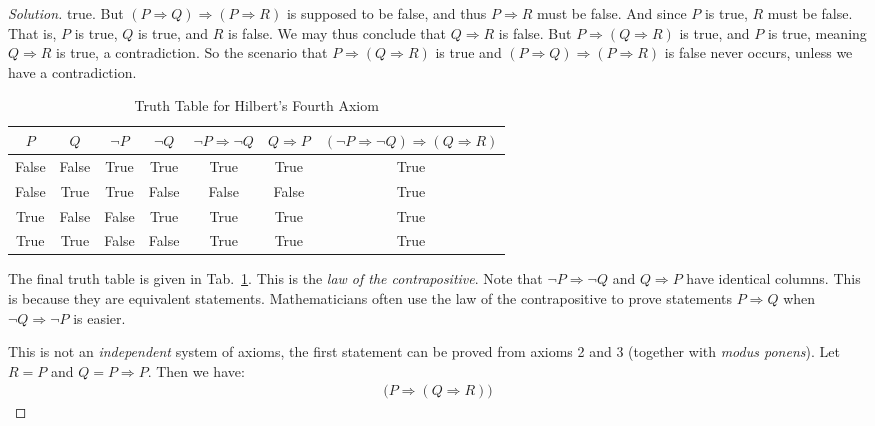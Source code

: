 \documentclass{article}
\theoremstyle{normal}
\begin{document}
\begin{proof}[Solution]
        true. But $(P\Rightarrow{Q})\Rightarrow(P\Rightarrow{R})$ is supposed
        to be false, and thus $P\Rightarrow{R}$ must be false. And since $P$ is
        true, $R$ must be false. That is, $P$ is true, $Q$ is true, and $R$ is
        false. We may thus conclude that $Q\Rightarrow{R}$ is false. But
        $P\Rightarrow(Q\Rightarrow{R})$ is true, and $P$ is true, meaning
        $Q\Rightarrow{R}$ is true, a contradiction. So the scenario that
        $P\Rightarrow(Q\Rightarrow{R})$ is true and
        $(P\Rightarrow{Q})\Rightarrow(P\Rightarrow{R})$ is false never occurs,
        unless we have a contradiction.
        \par\hfill\par
        \begin{table}
            \centering
            \begin{tabular}{c | c | c | c | c | c | c}
                $P$&$Q$&$\neg{P}$&$\neg{Q}$&
                $\neg{P}\Rightarrow\neg{Q}$&
                $Q\Rightarrow{P}$&
                $(\neg{P}\Rightarrow\neg{Q})\Rightarrow(Q\Rightarrow{R})$\\
                \hline
                False&False&True&True&True&True&True\\
                False&True&True&False&False&False&True\\
                True&False&False&True&True&True&True\\
                True&True&False&False&True&True&True
            \end{tabular}
            \caption{Truth Table for Hilbert's Fourth Axiom}
            \label{tab:hilberts_fourth}
        \end{table}
        The final truth table is given in Tab.~\ref{tab:hilberts_fourth}. This
        is the \textit{law of the contrapositive}. Note that
        $\neg{P}\Rightarrow\neg{Q}$ and $Q\Rightarrow{P}$ have identical
        columns. This is because they are equivalent statements. Mathematicians
        often use the law of the contrapositive to prove statements
        $P\Rightarrow{Q}$ when $\neg{Q}\Rightarrow\neg{P}$ is easier.
        \par\hfill\par
        This is not an \textit{independent} system of axioms, the first
        statement can be proved from axioms 2 and 3 (together with
        \textit{modus ponens}). Let $R=P$ and $Q=P\Rightarrow{P}$. Then we have:
        \begin{align}
            \big(P\Rightarrow(Q\Rightarrow{R})\big)

\end{align}
\end{proof}
\end{document}
